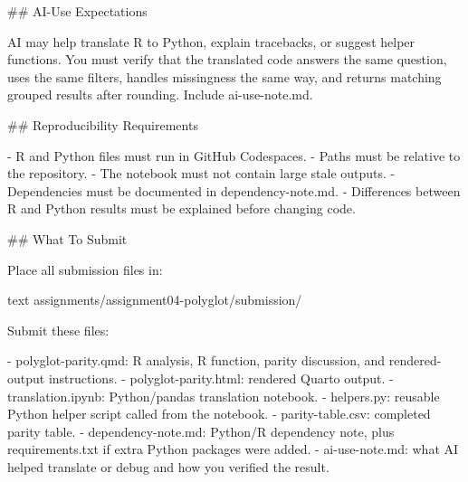 \documentclass[
  letterpaper,
  DIV=11,
  numbers=noendperiod,
  oneside]{scrreprt}
\newenvironment{Shaded}{\begin{snugshade}}{\end{snugshade}}
\newcommand{\FunctionTok}[1]{\textcolor[rgb]{0.28,0.35,0.67}{#1}}
\newcommand{\InformationTok}[1]{\textcolor[rgb]{0.37,0.37,0.37}{#1}}
\newcommand{\NormalTok}[1]{\textcolor[rgb]{0.00,0.23,0.31}{#1}}
\newcommand{\SpecialStringTok}[1]{\textcolor[rgb]{0.13,0.47,0.30}{#1}}
\begin{document}
\begin{Shaded}
\begin{Highlighting}[numbers=left,,]
\FunctionTok{\#\# AI{-}Use Expectations}

\NormalTok{AI may help translate R to Python, explain tracebacks, or suggest helper functions. You must verify that the translated code answers the same question, uses the same filters, handles missingness the same way, and returns matching grouped results after rounding. Include }\InformationTok{\textasciigrave{}ai{-}use{-}note.md\textasciigrave{}}\NormalTok{.}

\FunctionTok{\#\# Reproducibility Requirements}

\SpecialStringTok{{-} }\NormalTok{R and Python files must run in GitHub Codespaces.}
\SpecialStringTok{{-} }\NormalTok{Paths must be relative to the repository.}
\SpecialStringTok{{-} }\NormalTok{The notebook must not contain large stale outputs.}
\SpecialStringTok{{-} }\NormalTok{Dependencies must be documented in }\InformationTok{\textasciigrave{}dependency{-}note.md\textasciigrave{}}\NormalTok{.}
\SpecialStringTok{{-} }\NormalTok{Differences between R and Python results must be explained before changing code.}

\FunctionTok{\#\# What To Submit}

\NormalTok{Place all submission files in:}

\InformationTok{\textasciigrave{}\textasciigrave{}\textasciigrave{}text}
\InformationTok{assignments/assignment04{-}polyglot/submission/}
\InformationTok{\textasciigrave{}\textasciigrave{}\textasciigrave{}}

\NormalTok{Submit these files:}

\SpecialStringTok{{-} }\InformationTok{\textasciigrave{}polyglot{-}parity.qmd\textasciigrave{}}\NormalTok{: R analysis, R function, parity discussion, and rendered{-}output instructions.}
\SpecialStringTok{{-} }\InformationTok{\textasciigrave{}polyglot{-}parity.html\textasciigrave{}}\NormalTok{: rendered Quarto output.}
\SpecialStringTok{{-} }\InformationTok{\textasciigrave{}translation.ipynb\textasciigrave{}}\NormalTok{: Python/pandas translation notebook.}
\SpecialStringTok{{-} }\InformationTok{\textasciigrave{}helpers.py\textasciigrave{}}\NormalTok{: reusable Python helper script called from the notebook.}
\SpecialStringTok{{-} }\InformationTok{\textasciigrave{}parity{-}table.csv\textasciigrave{}}\NormalTok{: completed parity table.}
\SpecialStringTok{{-} }\InformationTok{\textasciigrave{}dependency{-}note.md\textasciigrave{}}\NormalTok{: Python/R dependency note, plus }\InformationTok{\textasciigrave{}requirements.txt\textasciigrave{}}\NormalTok{ if extra Python packages were added.}
\SpecialStringTok{{-} }\InformationTok{\textasciigrave{}ai{-}use{-}note.md\textasciigrave{}}\NormalTok{: what AI helped translate or debug and how you verified the result.}


\end{Highlighting}
\end{Shaded}
\end{document}
